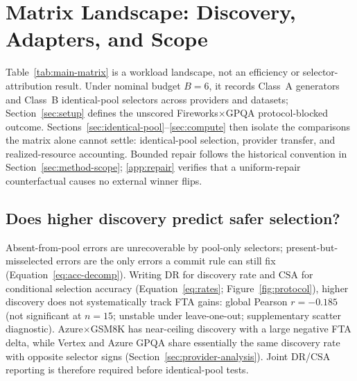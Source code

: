 \section{Matrix Landscape: Discovery, Adapters, and Scope}
\label{sec:results}

Table~\ref{tab:main-matrix} is a workload landscape, not an efficiency or selector-attribution
result. Under nominal budget $B{=}6$, it records Class~A generators and Class~B identical-pool
selectors across providers and datasets; Section~\ref{sec:setup} defines the unscored
Fireworks$\times$GPQA protocol-blocked outcome. Sections~\ref{sec:identical-pool}--\ref{sec:compute}
then isolate the comparisons the matrix alone cannot settle: identical-pool selection, provider
transfer, and realized-resource accounting. Bounded repair follows the historical convention in
Section~\ref{sec:method-scope}; \ref{app:repair} verifies that a uniform-repair
counterfactual causes no external winner flips.

\begin{table}[tbp]
\centering
\footnotesize
\setlength{\tabcolsep}{3pt}
\caption{Provider$\times$dataset landscape under nominal $B{=}6$. Class~A columns are closed-API
generators (Frontier diagnostic; L1-/S1-/TALE-style adapters). Class~B columns select over the
\emph{same} four-generator pool (pool cost $\leq 4B$; $0$ extra model calls). Bold marks the highest
Class~A count and, separately, the higher of FTA vs.\ Pooled-4 as descriptive highlighting. Trust
tiers and the Fireworks$\times$GPQA blocked outcome are defined in
Section~\ref{sec:setup}.}
\label{tab:main-matrix}

\end{table}

\subsection{Does higher discovery predict safer selection?}

Absent-from-pool errors are unrecoverable by pool-only selectors; present-but-misselected errors are
the only errors a commit rule can still fix (Equation~\eqref{eq:acc-decomp}). Writing $\mathrm{DR}$
for discovery rate and $\mathrm{CSA}$ for conditional selection accuracy
(Equation~\eqref{eq:rates}; Figure~\ref{fig:protocol}), higher discovery does not systematically track
FTA gains: global Pearson $r=-0.185$ (not significant at $n{=}15$; unstable under leave-one-out;
supplementary scatter diagnostic). Azure$\times$GSM8K has near-ceiling discovery with a large negative FTA
delta, while Vertex and Azure GPQA share essentially the same discovery rate with opposite selector
signs (Section~\ref{sec:provider-analysis}). Joint $\mathrm{DR}$/$\mathrm{CSA}$ reporting is
therefore required before identical-pool tests.

